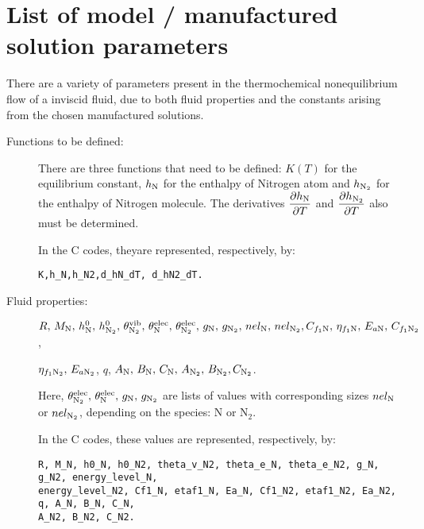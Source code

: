 \section{List of model / manufactured solution parameters}\label{Appendix:01}

There are a variety of parameters present in the thermochemical nonequilibrium flow of a inviscid fluid, due to both fluid properties and the constants arising from the chosen manufactured solutions.

\begin{description}
\item[Functions to be defined:] There are three functions that need to be defined: $K(T)$ for the equilibrium constant, $h_{\text{N}}$ for the enthalpy of Nitrogen atom and $h_{\text{N}_2}$ for the enthalpy of Nitrogen molecule. The derivatives  $\dfrac{\partial h_{\text{N}} }{\partial T}$ and $\dfrac{\partial h_{\text{N}_2} }{\partial T}$ also must be determined.


\vspace{10pt}
In the C codes, theyare represented, respectively, by:
\vspace{-5pt}
\begin{verbatim}
K,h_N,h_N2,d_hN_dT, d_hN2_dT.
\end{verbatim}



\item[Fluid properties:] $R , \, M_{\text{N}} , \,  h^0_{\text{N}} , \, h^0_{\text{N}_2} , \, \theta^{\text{vib}}_{\text{N}_2} , \, \theta^{\text{elec}}_{\text{N}} , \, 
\theta^{\text{elec}}_{\text{N}_2} , \,   g_{\text{N}} , \,  g_{\text{N}_2} , \,  nel_{\text{N}} , \, nel_{\text{N}_2} ,  C_{f_1 \text{N}} , \,  \eta_{f_1
\text{N}}  , \, E_{a\text{N}} , \,  C_{f_1 \text{N}_2} $,  

$  \eta_{f_1 \text{N}_2},  \,E_{a\text{N}_2}$, $ q$, $A_{\text{N}},\, B_{\text{N}},\, C_{\text{N}},\, A_{\text{N}_2},\, B_{\text{N}_2}, C_{\text{N}_2}$.  

Here,  $ \theta^{\text{elec}}_{\text{N}_2} , \,  \theta^{\text{elec}}_{\text{N}} , \,  g_{\text{N}} , \,  g_{\text{N}_2}$ are lists of values
with corresponding sizes $ nel_{\text{N}}$ or $nel_{\text{N}_2}$,  depending on the species: N or N$_2$.



\vspace{10pt}
In the C codes, these values are represented, respectively, by:
\vspace{-5pt}
\begin{verbatim}
R, M_N, h0_N, h0_N2, theta_v_N2, theta_e_N, theta_e_N2, g_N, g_N2, energy_level_N, 
energy_level_N2, Cf1_N, etaf1_N, Ea_N, Cf1_N2, etaf1_N2, Ea_N2, q, A_N, B_N, C_N, 
A_N2, B_N2, C_N2.

\end{verbatim}



\end{description}
